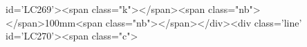 id='LC269'><span class="k">\vspace</span><span class="nb">{</span>100mm<span class="nb">}</span></div><div class='line' id='LC270'><span class="c">%